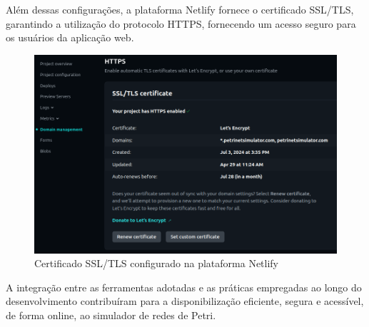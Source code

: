 \documentclass[
	12pt,				%
	openright,			%
	oneside,			%
	a4paper,			%
	english,			%
	brazil				%
	]{abntex2}
\theoremstyle{doispontos}
\begin{document}
Além dessas configurações, a plataforma Netlify fornece o certificado SSL/TLS, garantindo a utilização do protocolo HTTPS, fornecendo um acesso seguro para os usuários da aplicação web. 

\begin{figure}[ht] 
	\centering
	\includegraphics[scale=0.5]{figuras/netlify3.png}
	\caption[Certificado SSL/TLS configurado na plataforma Netlify]{Certificado SSL/TLS configurado na plataforma Netlify}
	\label{fig:netlify3}
\end{figure}
\FloatBarrier

A integração entre as ferramentas adotadas e as práticas empregadas ao longo do desenvolvimento contribuíram para a disponibilização eficiente, segura e acessível, de forma online, ao simulador de redes de Petri. 



\end{document}
